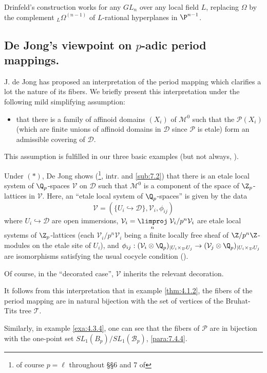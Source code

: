 \begin{para}
Drinfeld's construction works for any $GL_n$ over any local field $L$,
replacing $\Omega$ by the complement ${}_L\Omega^{(n-1)}$ of
$L$-rational hyperplanes in $\P^{n-1}$.


\subsection{De Jong's viewpoint on $p$-adic period mappings.}\label{sub:6.4}

 J. de Jong \cite{efgonas} has proposed an interpretation of the
 period mapping which clarifies a lot the nature of its fibers. We
 briefly present this interpretation under the following mild simplifying
 assumption:

\begin{itemize}
 \item[$\ast$] that there is a family of 
 affinoid domains $(X_i)$ of $\mathcal{M}^0$ such that the
 $\mathcal{P}(X_i)$ (which are finite unions of affinoid domains in
 $\mathcal{D}$ since
 $\mathcal{P}$ is etale) form an admissible covering of $\mathcal{D}$. 
\end{itemize}

This assumption is fulfilled in our three basic examples (but not
always, \cf \cite[5.53]{psfpg}).

 Under $(\ast)$, De Jong shows (\loccit\footnote{of course
 $p=\ell$ throughout \S\S  6 and 7 of \loccit }, intr. and \ref{sub:7.2}) that
 there is an etale local system of 
 $\Q_p$-spaces $\mathcal{V}$ on $\mathcal{D}$ such that
 $\mathcal{M}^0$ is a component of the space of
 $\Z_p$-lattices in $\mathcal{V}$. Here, an ``etale local system
 of $\Q_p$-spaces'' is given by the data
 \begin{equation*}
  \mathcal{V}=(\{U_i\hookrightarrow \mathcal{D}\}, \mathcal{V}_i, \phi_{ij})
 \end{equation*}
 where $U_i\hookrightarrow \mathcal{D}$ are open immersions,
 $\mathcal{V}_i=\underset{n}{\limproj}
 \;\mathcal{V}_i/p^n\mathcal{V}_i$ are etale local systems of
 $\Z_p$-lattices (each $\mathcal{V}_i/p^n\mathcal{V}_i$ being a finite
 locally free sheaf of $\Z/p^n\Z$-modules on the etale site of $U_i$),
 and $ \phi_{ij}: (\mathcal{V}_i\otimes \Q_p)_{|
 U_i\times_\mathcal{D}U_j} \rightarrow (\mathcal{V}_j\otimes \Q_p)_{|
 U_i\times_\mathcal{D}U_j} $ are isomorphisms satisfying the usual
 cocycle condition (\cf \cite[4]{efgonas}).


 Of course, in the ``decorated case'', $\mathcal{V}$ inherits the
 relevant decoration.

 It follows from this interpretation that in example \ref{thm:4.1.2}, the
 fibers of the period mapping are in natural bijection with the set of
 vertices of the Bruhat-Tits tree $\mathcal{T}$.

 Similarly, in example \ref{exa:4.3.4}, one can see that the fibers of
 $\mathcal{P}$ are in bijection with the 
 one-point set $SL_1(B_p)/SL_1(\mathcal{B}_p)$, \cf \ref{para:7.4.4}.
\end{para}

